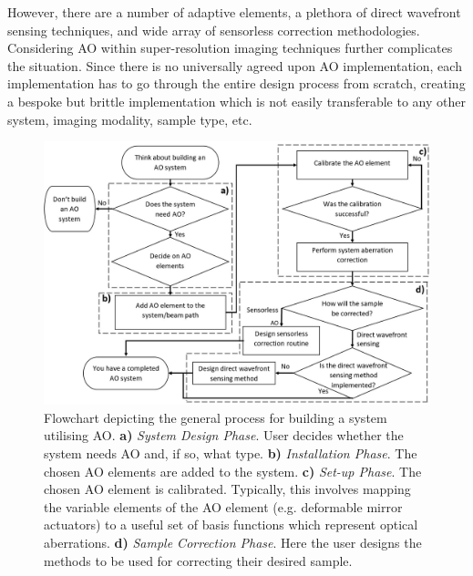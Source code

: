 However, there are a number of adaptive elements\cite{olivier2002advanced}, 
a plethora of direct wavefront sensing techniques\cite{antonello2014optimisation,trumper2016instantaneous,
	schwertner2004measurement}, and wide array of 
sensorless correction methodologies\cite{burke2015adaptive,booth2002adaptive,
	fienup2003aberration,antonello2020multi,debarre2007image}. 
Considering AO within super-resolution imaging techniques further complicates
the 
situation\cite{debarre2008adaptive,booth2015aberrations,thomas2015enhanced}.
Since there is no universally agreed upon AO implementation, each 
implementation has to go through the entire design process from scratch, 
creating a bespoke but brittle implementation which is not easily transferable
to any other system, imaging modality, sample type, etc. 

\begin{figure}[h]
	\centering
	\includegraphics[width=1\textwidth, scale=0.5]{./images/ao_system_setup_workflow_new.jpg}
	\caption[Flowchart depicting the general process for building a system utilising AO.]{Flowchart depicting the general process for building a system utilising AO. \textbf{a)} \textit{System Design Phase}. User decides whether the system needs AO and, if so, what type. \textbf{b)} \textit{Installation Phase}. The chosen AO elements are added to the system. \textbf{c)} \textit{Set-up Phase}. The chosen AO element is calibrated. Typically, this involves mapping the variable elements of the AO element (e.g. deformable mirror actuators) to a useful set of basis functions which represent optical aberrations. \textbf{d)} \textit{Sample Correction Phase}. Here the user designs the methods to be used for correcting their desired sample.}
	\label{fig:ao_system_setup_workflow}
\end{figure}

